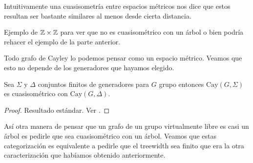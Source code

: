 \documentclass[tesis.tex]{subfiles}
\begin{document}
Intuitivamente una cuasisometría entre espacios métricos nos dice que estos resultan ser bastante similares al menos desde cierta distancia. 
\medskip

\begin{ej}
Ejemplo de $\mathbb Z \times \mathbb Z$ para ver que no es cuasisométrico con un árbol o bien podría rehacer el ejemplo de la parte anterior.
\end{ej}

Todo grafo de Cayley lo podemos pensar como un espacio métrico.  
Veamos que esto no depende de los generadores que hayamos elegido.

\begin{prop}
	Sea $\Sigma$ y $\Delta$ conjuntos finitos de generadores para $G$ grupo entonces $\text{Cay}(G,\Sigma)$ es cuasisométrico con $\text{Cay}(G, \Delta).$
\end{prop}

\begin{proof}
	Resultado estándar. Ver \cite{bridson2013metric}.
\end{proof}



Así otra manera de pensar que un grafo de un grupo virtualmente libre es casi un árbol es pedirle que sea cuasisométrico con un árbol. 
Veamos que estas categorización es equivalente a pedirle que el treewidth sea finito que era la otra caracterización que habíamos obtenido anteriormente.
\end{document}

